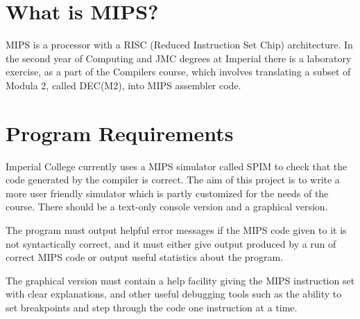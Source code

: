 

\section{What is MIPS?}

MIPS is a processor with a RISC (Reduced Instruction Set Chip) architecture. In the second year of Computing and JMC degrees at Imperial there is a laboratory exercise, as a part of the Compilers course, which involves translating a subset of Modula 2, called DEC(M2), into MIPS assembler code.


\section{Program Requirements}

Imperial College currently uses a MIPS simulator called SPIM to check that the code generated by the compiler is correct. The aim of this project is to write a more user friendly simulator which is partly customized for the needs of the course. There should be a text-only console version and a graphical version.

The program must output helpful error messages if the MIPS code given to it is not syntactically correct, and it must either give output produced by a run of correct MIPS code or output useful statistics about the program.

The graphical version must contain a help facility giving the MIPS instruction set with clear explanations, and other useful debugging tools such as the ability to set breakpoints and step through the code one instruction at a time.
